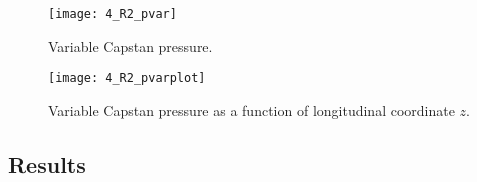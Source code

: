 \begin{figure}[H]
	\centering
	\texttt{[image: 4\_R2\_pvar]}
	\caption{Variable Capstan pressure.}
	\label{fig:4_R2_pvar}
\end{figure}

\begin{figure}[H]
	\centering
	\texttt{[image: 4\_R2\_pvarplot]}
	\caption{Variable Capstan pressure as a function of longitudinal coordinate $z$.}
	\label{fig:4_R2_pvarplot}
\end{figure}


\subsection{Results}

